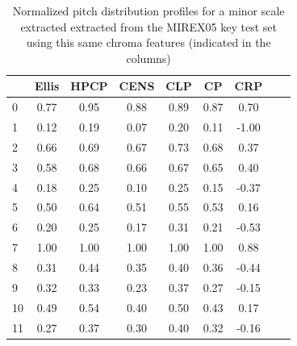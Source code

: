 \documentclass{article}
\begin{document}
\begin{table}
 \begin{center}
 \begin{tabular}{|l|c|c|c|c|c|c|c|c|}
   \hline
  			&	Ellis	&	HPCP		&	CENS		&	CLP		&	CP		&	CRP		\\
  \hline
  	0		&	0.77		&	0.95		&	0.88		&	0.89		&	0.87		&	0.70		\\
  	1		&	0.12		&	0.19		&	0.07		&	0.20		&	0.11		&	-1.00	\\
  	2		&	0.66		&	0.69		&	0.67		&	0.73		&	0.68 	&	0.37		\\
  	3		&	0.58		&	0.68		&	0.66		&	0.67		&	0.65 	&	0.40		\\
  	4		&	0.18		&	0.25		&	0.10		&	0.25		&	0.15  	&	-0.37	\\
  	5		&	0.50		&	0.64		&	0.51		&	0.55		&	0.53  	&	0.16		\\
  	6		&	0.20		&	0.25		&	0.17		&	0.31		&	0.21  	&	-0.53	\\
  	7		&	1.00		&	1.00		&	1.00		&	1.00		&	1.00  	&	0.88		\\
  	8		&	0.31		&	0.44		&	0.35		&	0.40		&	0.36  	&	-0.44	\\
  	9		&	0.32		&	0.33		&	0.23		&	0.37		&	0.27  	&	-0.15	\\
  	10		&	0.49		&	0.54		&	0.40		&	0.50		&	0.43  	&	0.17		\\
  	11		&	0.27		&	0.37		&	0.30		&	0.40		&	0.32  	&	-0.16	\\
  \hline
 \end{tabular}
\end{center}
 \caption{Normalized pitch distribution profiles for a minor scale extracted extracted from the MIREX05 key test set using this same chroma features (indicated in the columns)}
 \label{tab:extracted_profiles_m}
\end{table}
\end{document}
